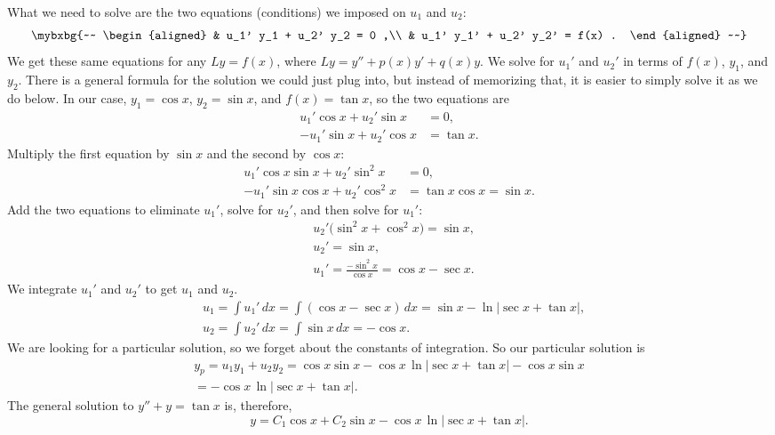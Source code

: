 What we need to solve are the two equations (conditions) we imposed
on $u_1$ and $u_2$:
\begin{equation*}
\mybxbg{~~
\begin{aligned}
& u_1' y_1 + u_2' y_2 = 0 ,\\
& u_1' y_1' + u_2' y_2' = f(x) .
\end{aligned}
~~}
\end{equation*}
We get these same equations for any $Ly = f(x)$, where $Ly = y''+p(x)y'+q(x)y$.
We solve for $u_1'$ and $u_2'$ in terms of $f(x)$, $y_1$, and $y_2$.
There is a general
formula for the solution we could just plug into, but instead of memorizing
that, it is easier to simply solve it as we do below.  In our case,
$y_1 = \cos x$, 
$y_2 = \sin x$,
and $f(x) = \tan x$,
so the two equations are
\begin{equation*}
\begin{aligned}
u_1' \cos x + u_2' \sin x &= 0 ,\\
-u_1' \sin x + u_2' \cos x &= \tan x .
\end{aligned}
\end{equation*}
Multiply the first equation by $\sin x$ and the second by $\cos x$:
\begin{equation*}
\begin{aligned}
u_1' \cos x \sin x + u_2' \sin^2 x & = 0 ,\\
-u_1' \sin x \cos x + u_2' \cos^2 x & = \tan x \cos x = \sin x .
\end{aligned}
\end{equation*}
Add the two equations to eliminate $u_1'$, solve for $u_2'$, and then
solve for $u_1'$:
\begin{equation*}
\begin{aligned}
& u_2' \bigl(\sin^2 x + \cos^2 x\bigr) = \sin x , \\
& u_2' = \sin x , \\
& u_1' = \frac{- \sin^2 x}{\cos x} = \cos x - \sec x .
\end{aligned}
\end{equation*}
We integrate $u_1'$ and $u_2'$ to get $u_1$ and $u_2$.
\begin{equation*}
\begin{aligned}
& u_1 = \int u_1'\,dx 
= \int ( \cos x-\sec x ) \,dx
= \sin x -
\ln \left\lvert \sec x + \tan x \right\rvert
, \\
& u_2 = \int u_2'\,dx 
= \int \sin x\,dx = -\cos x .
\end{aligned}
\end{equation*}
We are looking for a particular solution, so we forget about the constants
of integration.
So our particular solution is
\begin{multline*}
y_p = u_1 y_1 + u_2 y_2 =
\cos x \sin x
-
\cos x
\,
\ln \lvert
\sec x + \tan x
\rvert
-\cos x \sin x
\\ =
-
\cos x \, \ln \lvert
\sec x + \tan x
\rvert .
\end{multline*}
The general solution to $y'' + y = \tan x$ is, therefore,
\begin{equation*}
y = C_1 \cos x + C_2 \sin x
-
\cos x \, \ln \lvert
\sec x + \tan x
\rvert .
\end{equation*}

